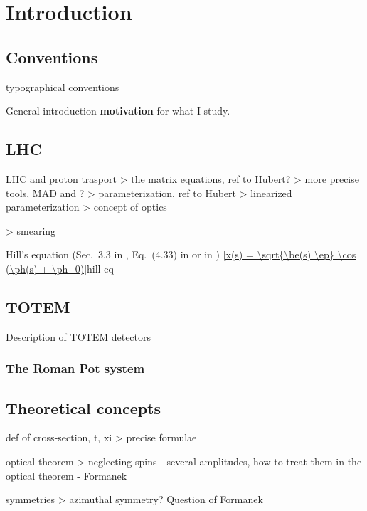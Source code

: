 \chapter{Introduction}

\section{Conventions}

\> typographical conventions


\> General introduction
\> {\bf motivation} for what I study.

\section{LHC}

\> LHC and proton trasport
\>> the matrix equations, ref to Hubert?
\>> more precise tools, MAD and ?
\>> parameterization, ref to Hubert
\>> linearized parameterization
\>> concept of optics

\>> smearing

Hill's equation (Sec.~3.3 in , Eq.~(4.33) in  or in )
\eqref{x(s) = \sqrt{\be(s) \ep} \cos (\ph(s) + \ph_0)}{hill eq}

\section{TOTEM}

\> Description of TOTEM detectors

\subsection{The Roman Pot system}


\section{Theoretical concepts}

\> def of cross-section, t, xi
\>> precise formulae

\> optical theorem
\>> neglecting spins - several amplitudes, how to treat them in the optical theorem - Formanek

\> symmetries
\>> azimuthal symmetry? Question of Formanek
